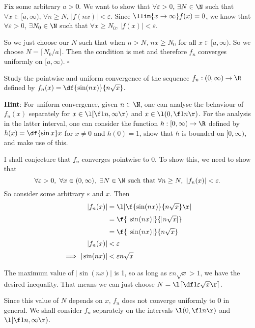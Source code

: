 \documentclass[a4paper]{article}
\begin{document}
Fix some arbitrary $a > 0$. We want to show that $\forall \varepsilon > 0$, $\exists N \in \N$ such that $\forall x \in [a, \infty)$, $\forall n \ge N$, $| f(nx) | < \varepsilon$. Since $\llim{x \to \infty} f(x) = 0$, we know that $\forall \varepsilon > 0$, $\exists N_0 \in \N$ such that $\forall x \ge N_0$, $|f(x)| < \varepsilon$. %

So we just choose our $N$ such that when $n > N$, $nx \ge N_0$ for all $x \in [a, \infty)$. So we choose $N = \lceil N_0 / a \rceil$. Then the condition is met and therefore $f_n$ converges uniformly on $[a, \infty)$. %
\hfill$\square$



\begin{questionbody}
Study the pointwise and uniform convergence of the sequence $f_n : (0, \infty) \to \R$ defined by $f_n(x) = \df{\sin(nx)}{n \sqrt x}$.

\textbf{Hint}: For uniform convergence, given $n \in \N$, one can analyse the behaviour of $f_n(x)$ separately for $x \in \l[ \f1n, \infty \r)$ and $x \in \l( 0, \f1n \r)$. For the analysis in the latter interval, one can consider the function $h : [0, \infty) \to \R$ defined by $h(x) = \df{\sin x}x$ for $x \ne 0$ and $h(0) = 1$, show that $h$ is bounded on $[0, \infty)$, and make use of this. %
\end{questionbody}

I shall conjecture that $f_n$ converges pointwise to 0. To show this, we need to show that \[
\forall \varepsilon > 0,\ \forall x \in (0, \infty),\ \exists N \in \N \text{ such that } \forall n \ge N,\ |f_n(x)| < \varepsilon .
\]
So consider some arbitrary $\varepsilon$ and $x$. Then \begin{align*}
|f_n(x)| &= \l| \f{\sin(nx)}{n \sqrt x} \r| \\[0.5ex]
&= \f{|\sin(nx)|}{|n \sqrt x|} \\[0.5ex]
&= \f{|\sin(nx)|}{n \sqrt x} \\[0.5ex]
|f_n(x)| &< \varepsilon \\[0.5ex]
\implies |\sin(nx)| &< \varepsilon n \sqrt x
\end{align*}

The maximum value of $|\sin(nx)|$ is 1, so as long as $\varepsilon n \sqrt x > 1$, we have the desired inequality. That means we can just choose $N = \l\lceil \df1{\varepsilon \sqrt x} \r\rceil$.

Since this value of $N$ depends on $x$, $f_n$ does not converge uniformly to 0 in general. We shall consider $f_n$ separately on the intervals $\l( 0, \f1n \r)$ and $\l[ \f1n, \infty \r)$. %
\end{document}
